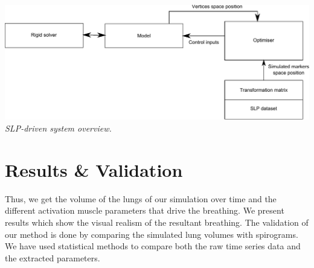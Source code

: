 \documentclass[boxedsections ,landscape, a0]{sciposter_v2}
\begin{document}
\begin{multicols}{4}
  \begin{center}
  \vspace{-\bigskipamount}     

    \includegraphics[width=\columnwidth]{imgs/slp_optim}
      \emph{SLP-driven system overview.}

   \vspace{-\bigskipamount}     
  \end{center}
  
\section*{Results \& Validation}	
Thus, we get the volume of the lungs of our simulation
over time and the different activation muscle parameters that drive
the breathing. We present results which show the visual realism of
the resultant breathing. The validation of our method is done by 
comparing the simulated lung volumes with spirograms. We have used 
statistical methods to compare both the raw time series data and 
the extracted parameters.

\begin{figure}

\centering
{}


\end{figure}
\end{multicols}
\end{document}
